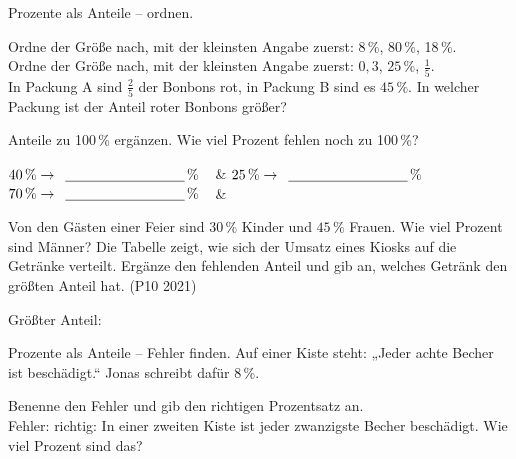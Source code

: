 \begin{aufgabe}{Prozente als Anteile – ordnen.}
\begin{teile}
\teil Ordne der Größe nach, mit der kleinsten Angabe zuerst: 8\,\%, 80\,\%, 18\,\%. \\ \leerfeld\leerfeld\leerfeld
\teil Ordne der Größe nach, mit der kleinsten Angabe zuerst: $0{,}3$, $25\,\%$, $\frac{1}{5}$. \\ \leerfeld\leerfeld\leerfeld
\teil In Packung A sind $\frac{2}{5}$ der Bonbons rot, in Packung B sind es $45\,\%$. In welcher Packung ist der Anteil roter Bonbons größer? \leerfeld
\end{teile}
\end{aufgabe}

\begin{aufgabe}{Anteile zu 100\,\% ergänzen. Wie viel Prozent fehlen noch zu 100\,\%?}
\begin{teilezwei}
\tz $40\,\% \rightarrow \leerfeld[\%]$ & \tz $25\,\% \rightarrow \leerfeld[\%]$ \\
\tz $70\,\% \rightarrow \leerfeld[\%]$ & \\
\end{teilezwei}
\begin{teile}
\teil Von den Gästen einer Feier sind $30\,\%$ Kinder und $45\,\%$ Frauen. Wie viel Prozent sind Männer? \leerfeld[\%]
\teil Die Tabelle zeigt, wie sich der Umsatz eines Kiosks auf die Getränke verteilt. Ergänze den fehlenden Anteil und gib an, welches Getränk den größten Anteil hat. \hfill (P10 2021)
\end{teile}
\begin{teile}
\teil Größter Anteil: \leerfeld
\end{teile}
\end{aufgabe}

\begin{aufgabe}{Prozente als Anteile – Fehler finden. Auf einer Kiste steht: „Jeder achte Becher ist beschädigt.“ Jonas schreibt dafür 8\,\%.}
\begin{teile}
\teil Benenne den Fehler und gib den richtigen Prozentsatz an. \\ Fehler: \dsleer\dsleer\dsleer \quad richtig: \leerfeld[\%]
\teil In einer zweiten Kiste ist jeder zwanzigste Becher beschädigt. Wie viel Prozent sind das? \leerfeld[\%]
\end{teile}
\end{aufgabe}

